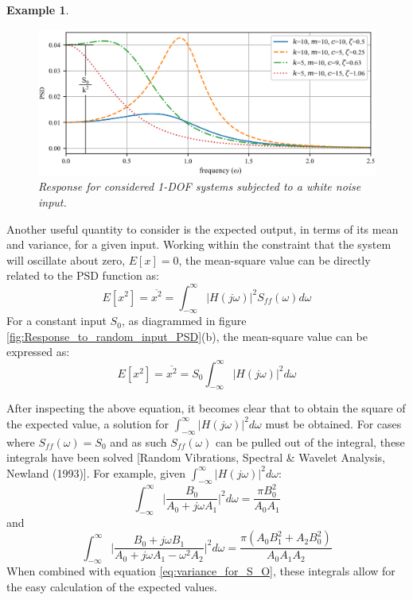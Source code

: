 \documentclass[12pt,letter]{article}
\newtheorem{ex}{Example}
\numberwithin{ex}{section} %
\newenvironment{example}{\begin{mdframed}[middlelinewidth=0.5mm]\begin{ex}\normalfont}{\end{ex}\end{mdframed}}
\numberwithin{re}{section} %
\numberwithin{equation}{section}	%
\begin{document}
\begin{example}
\begin{figure}[H]
		\centering
		\includegraphics[width=1\textwidth]{../figures/response_to_white_noise_with_annotation.png}
		\caption{Response for considered 1-DOF systems subjected to a white noise input.}
	\end{figure}
\end{example}  

Another useful quantity to consider is the expected output, in terms of its mean and variance, for a given input. Working within the constraint that the system will oscillate about zero, $E[x]=0$, the mean-square value can be directly related to the PSD function as:
\begin{equation}
E[x^2] = \overline{x^2} =   \int_{-\infty}^{\infty} |H(j\omega)|^2 S_{ff}(\omega) d\omega
\end{equation}
For a constant input $S_0$, as diagrammed in figure \ref{fig:Response_to_random_input_PSD}(b), the mean-square value can be expressed as:
\begin{equation}
E[x^2] = \overline{x^2} =   S_{0} \int_{-\infty}^{\infty} |H(j\omega)|^2 d\omega
\label{eq:variance_for_S_O}
\end{equation}

After inspecting the above equation, it becomes clear that to obtain the square of the expected value, a solution for  $\int_{-\infty}^{\infty} |H(j\omega)|^2 d\omega$ must be obtained. For cases where $S_{ff}(\omega) = S_0$ and as such $S_{ff}(\omega)$ can be pulled out of the integral, these integrals have been solved [Random Vibrations, Spectral \& Wavelet Analysis, Newland (1993)]. For example, given $\int_{-\infty}^{\infty} |H(j\omega)|^2 d\omega$:
\begin{equation}
\int_{-\infty}^{\infty} \bigg|\frac{B_0}{A_0+j \omega A_1} \bigg|^2 d\omega = \frac{\pi B_0^2}{A_0 A_1}
\end{equation} 
and
\begin{equation}
\int_{-\infty}^{\infty} \bigg|\frac{B_0 + j \omega B_1}{A_0+j \omega A_1 - \omega^2 A_2} \bigg|^2 d\omega = \frac{\pi (A_0 B_1^2 + A_2 B_0^2)}{A_0 A_1 A_2}
\end{equation} 
When combined with equation \ref{eq:variance_for_S_O}, these integrals allow for the easy calculation of the expected values. 
\end{document}
